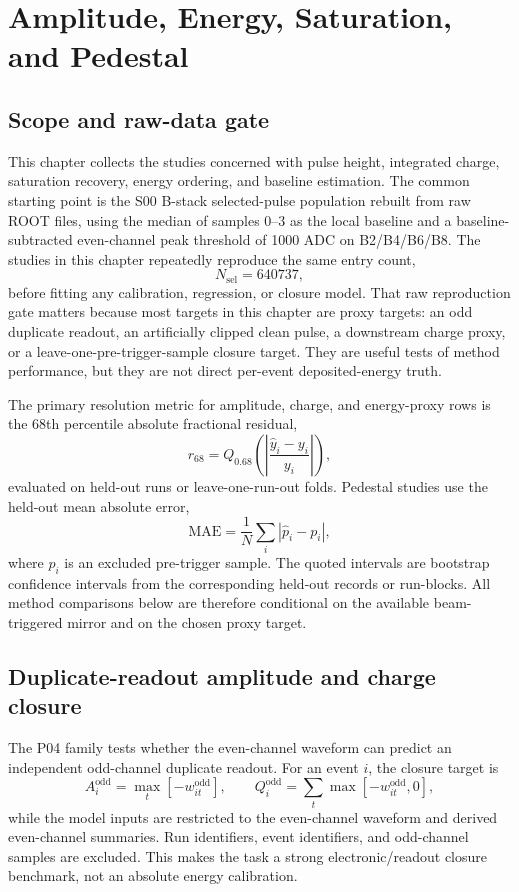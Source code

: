 \chapter{Amplitude, Energy, Saturation, and Pedestal}

\section{Scope and raw-data gate}

This chapter collects the studies concerned with pulse height, integrated
charge, saturation recovery, energy ordering, and baseline estimation.  The
common starting point is the S00 B-stack selected-pulse population rebuilt from
raw ROOT files, using the median of samples 0--3 as the local baseline and a
baseline-subtracted even-channel peak threshold of 1000 ADC on B2/B4/B6/B8.
The studies in this chapter repeatedly reproduce the same entry count,
\[
  N_{\mathrm{sel}}=640737,
\]
before fitting any calibration, regression, or closure model.  That raw
reproduction gate matters because most targets in this chapter are proxy
targets: an odd duplicate readout, an artificially clipped clean pulse, a
downstream charge proxy, or a leave-one-pre-trigger-sample closure target.
They are useful tests of method performance, but they are not direct
per-event deposited-energy truth.

The primary resolution metric for amplitude, charge, and energy-proxy rows is
the 68th percentile absolute fractional residual,
\[
  r_{68}
  = Q_{0.68}\left(\left|\frac{\hat{y}_i-y_i}{y_i}\right|\right),
\]
evaluated on held-out runs or leave-one-run-out folds.  Pedestal studies use
the held-out mean absolute error,
\[
  \mathrm{MAE}
  = \frac{1}{N}\sum_i |\hat{p}_i-p_i|,
\]
where \(p_i\) is an excluded pre-trigger sample.  The quoted intervals are
bootstrap confidence intervals from the corresponding held-out records or
run-blocks.  All method comparisons below are therefore conditional on the
available beam-triggered mirror and on the chosen proxy target.

\section{Duplicate-readout amplitude and charge closure}

The P04 family tests whether the even-channel waveform can predict an
independent odd-channel duplicate readout.  For an event \(i\), the closure
target is
\[
  A_i^{\mathrm{odd}} = \max_t[-w^{\mathrm{odd}}_{it}],
  \qquad
  Q_i^{\mathrm{odd}} = \sum_t \max[-w^{\mathrm{odd}}_{it},0],
\]
while the model inputs are restricted to the even-channel waveform and derived
even-channel summaries.  Run identifiers, event identifiers, and odd-channel
samples are excluded.  This makes the task a strong electronic/readout closure
benchmark, not an absolute energy calibration.

